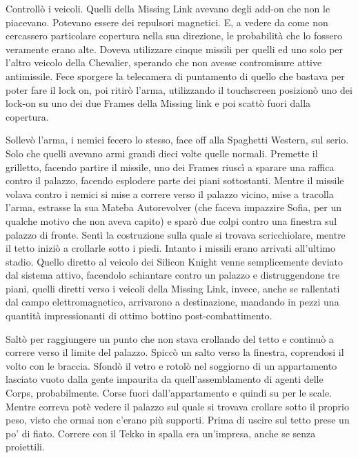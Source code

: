     Controllò i veicoli. Quelli della Missing Link avevano degli add-on che non le piacevano. Potevano essere dei
    repulsori magnetici. E, a vedere da come non cercassero particolare copertura nella sua direzione, le probabilità
    che lo fossero veramente erano alte. Doveva utilizzare cinque missili per quelli ed uno solo per l'altro veicolo
    della Chevalier, sperando che non avesse contromisure attive antimissile. Fece sporgere la telecamera di puntamento di quello che
    bastava per poter fare il lock on, poi ritirò l'arma, utilizzando il touchscreen posizionò uno dei lock-on su uno
    dei due Frames della Missing link e poi scattò fuori dalla copertura.

    Sollevò l'arma, i nemici fecero lo stesso, face off alla Spaghetti Western, sul serio. Solo che quelli avevano armi
    grandi dieci volte quelle normali. Premette il grilletto, facendo partire il missile, uno dei Frames riuscì a
    sparare una raffica contro il palazzo, facendo esplodere parte dei piani sottostanti. Mentre il missile volava
    contro i nemici si mise a correre verso il palazzo vicino, mise a tracolla l'arma, estrasse la sua Mateba
    Autorevolver (che faceva impazzire Sofia, per un qualche motivo che non aveva capito) e sparò due colpi contro una
    finestra sul palazzo di fronte. Sentì la costruzione sulla quale si trovava scricchiolare, mentre il tetto iniziò a
    crollarle sotto i piedi. Intanto i missili erano arrivati all'ultimo stadio. Quello diretto al veicolo dei Silicon
    Knight venne semplicemente deviato dal sistema attivo, facendolo schiantare contro un palazzo e distruggendone tre
    piani, quelli diretti verso i veicoli della Missing Link, invece, anche se rallentati dal campo elettromagnetico,
    arrivarono a destinazione, mandando in pezzi una quantità impressionanti di ottimo bottino post-combattimento.

    Saltò per raggiungere un punto che non stava crollando del tetto e continuò a correre verso il limite del palazzo.
    Spiccò un salto verso la finestra, coprendosi il volto con le braccia. Sfondò il vetro e rotolò nel soggiorno di un
    appartamento lasciato vuoto dalla gente impaurita da quell'assemblamento di agenti delle Corps, probabilmente. Corse
    fuori dall'appartamento e quindi su per le scale. Mentre correva potè vedere il palazzo sul quale si trovava
    crollare sotto il proprio peso, visto che ormai non c'erano più supporti. Prima di uscire sul tetto prese un po' di
    fiato. Correre con il Tekko in spalla era un'impresa, anche se senza proiettili.

